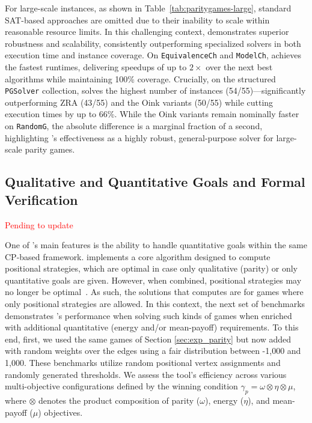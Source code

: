 \documentclass[a4paper,fleqn]{cas-sc}
\begin{document}
For large-scale instances, as shown in Table~\ref{tab:paritygames-large}, standard SAT-based approaches are omitted due to their inability to scale within reasonable resource limits. In this challenging context, \noc demonstrates superior robustness and scalability, consistently outperforming specialized solvers in both execution time and instance coverage. On \texttt{EquivalenceCh} and \texttt{ModelCh}, \noc achieves the fastest runtimes, delivering speedups of up to $2\times$ over the next best algorithms while maintaining 100\% coverage. Crucially, on the structured \texttt{PGSolver} collection, \noc solves the highest number of instances (54/55)—significantly outperforming ZRA (43/55) and the Oink variants (50/55) while cutting execution times by up to 66\%. While the Oink variants remain nominally faster on \texttt{RandomG}, the absolute difference is a marginal fraction of a second, highlighting \noc's effectiveness as a highly robust, general-purpose solver for large-scale parity games.


\subsection{Qualitative and Quantitative Goals and Formal Verification}\label{sec:exp_quantitative}

\textcolor{red}{Pending to update}

One of \noc's main features is the ability to handle quantitative goals within the same CP-based framework. 
%
\noc implements a core algorithm designed to compute positional strategies, which are optimal in case only qualitative (parity) or only quantitative goals are given. However, when combined, positional strategies may no longer be optimal~\cite{ChatterjeeHJ05,Chatterjee:2010}. As such, the solutions that \noc computes are for games where only positional strategies are allowed. 
%
In this context, the next set of benchmarks demonstrates \noc's performance when solving such kinds of games when enriched with additional quantitative (energy and/or mean-payoff) requirements.  
%
To this end, first, we used the same games of Section \ref{sec:exp_parity} but now added with random weights over the edges using a fair distribution between -1,000 and 1,000. These benchmarks utilize random positional vertex assignments and randomly generated thresholds. We assess the tool's efficiency across various multi-objective configurations defined by the winning condition $\gamma_{p} = \omega \otimes \eta \otimes \mu$, where $\otimes$ denotes the product composition of parity ($\omega$), energy ($\eta$), and mean-payoff ($\mu$) objectives.
\end{document}
